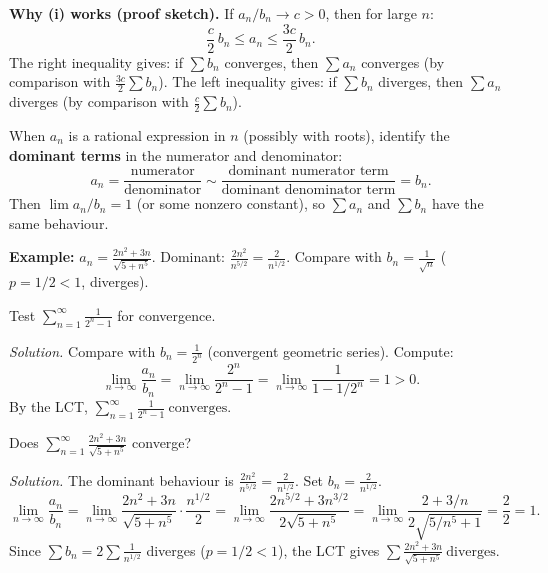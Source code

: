 \noindent
\textbf{Why (i) works (proof sketch).}
If $a_n/b_n\to c>0$, then for large $n$:
\[
\frac{c}{2}\,b_n\le a_n\le \frac{3c}{2}\,b_n.
\]
The right inequality gives: if $\sum b_n$ converges, then $\sum a_n$ converges (by comparison with $\frac{3c}{2}\sum b_n$).
The left inequality gives: if $\sum b_n$ diverges, then $\sum a_n$ diverges (by comparison with $\frac{c}{2}\sum b_n$).

\begin{examtip}[title={Exam Focus: Choosing the comparison series $b_n$ for LCT}]
When $a_n$ is a rational expression in $n$ (possibly with roots), identify the \textbf{dominant terms} in the numerator and denominator:
\[
a_n=\frac{\text{numerator}}{\text{denominator}}\sim \frac{\text{dominant numerator term}}{\text{dominant denominator term}}=b_n.
\]
Then $\lim a_n/b_n=1$ (or some nonzero constant), so $\sum a_n$ and $\sum b_n$ have the same behaviour.

\textbf{Example:} $a_n=\frac{2n^2+3n}{\sqrt{5+n^5}}$. Dominant: $\frac{2n^2}{n^{5/2}}=\frac{2}{n^{1/2}}$. Compare with $b_n=\frac{1}{\sqrt{n}}$ ($p=1/2<1$, diverges).
\end{examtip}

\begin{examplebox}[title={Worked Example (Lecture Example 5.6): LCT with geometric comparison}]
Test $\displaystyle\sum_{n=1}^{\infty}\frac{1}{2^n-1}$ for convergence.

\emph{Solution.}
Compare with $b_n=\frac{1}{2^n}$ (convergent geometric series). Compute:
\[
\lim_{n\to\infty}\frac{a_n}{b_n}=\lim_{n\to\infty}\frac{2^n}{2^n-1}=\lim_{n\to\infty}\frac{1}{1-1/2^n}=1>0.
\]
By the LCT, $\displaystyle\boxed{\sum_{n=1}^{\infty}\frac{1}{2^n-1}\ \text{converges}}$.
\end{examplebox}

\begin{examplebox}[title={Worked Example (Lecture Example 5.7): LCT with $p$-series}]
Does $\displaystyle\sum_{n=1}^{\infty}\frac{2n^2+3n}{\sqrt{5+n^5}}$ converge?

\emph{Solution.}
The dominant behaviour is $\frac{2n^2}{n^{5/2}}=\frac{2}{n^{1/2}}$. Set $b_n=\frac{2}{n^{1/2}}$.
\[
\lim_{n\to\infty}\frac{a_n}{b_n}
=\lim_{n\to\infty}\frac{2n^2+3n}{\sqrt{5+n^5}}\cdot\frac{n^{1/2}}{2}
=\lim_{n\to\infty}\frac{2n^{5/2}+3n^{3/2}}{2\sqrt{5+n^5}}
=\lim_{n\to\infty}\frac{2+3/n}{2\sqrt{5/n^5+1}}=\frac{2}{2}=1.
\]
Since $\sum b_n=2\sum \frac{1}{n^{1/2}}$ diverges ($p=1/2<1$), the LCT gives $\displaystyle\boxed{\sum\frac{2n^2+3n}{\sqrt{5+n^5}}\ \text{diverges}}$.
\end{examplebox}

